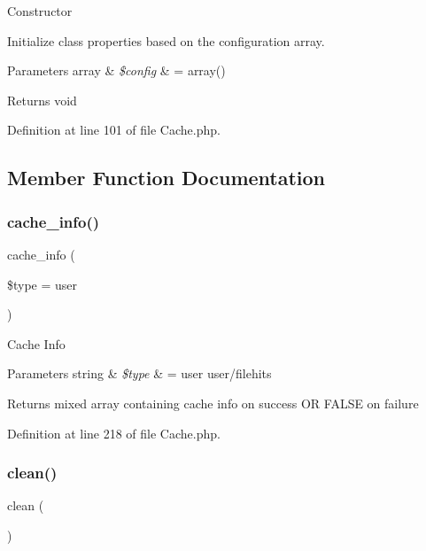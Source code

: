 Constructor

Initialize class properties based on the configuration array.


\begin{DoxyParams}[1]{Parameters}
array & {\em \$config} & = array() \\
\hline
\end{DoxyParams}
\begin{DoxyReturn}{Returns}
void 
\end{DoxyReturn}


Definition at line 101 of file Cache.\+php.



\subsection{Member Function Documentation}
\mbox{\label{class_c_i___cache_a26b8f7eef651dc3c0b5b9e1d8661a9ae}} 
\subsubsection{\texorpdfstring{cache\_info()}{cache\_info()}}
{\footnotesize\ttfamily cache\+\_\+info (\begin{DoxyParamCaption}\item[{}]{\$type = {\ttfamily \textquotesingle{}user\textquotesingle{}} }\end{DoxyParamCaption})}

Cache Info


\begin{DoxyParams}[1]{Parameters}
string & {\em \$type} & = \textquotesingle{}user\textquotesingle{} user/filehits \\
\hline
\end{DoxyParams}
\begin{DoxyReturn}{Returns}
mixed array containing cache info on success OR F\+A\+L\+SE on failure 
\end{DoxyReturn}


Definition at line 218 of file Cache.\+php.

\mbox{\label{class_c_i___cache_adb40b812890a8bc058bf6b7a0e1a54d9}} 
\subsubsection{\texorpdfstring{clean()}{clean()}}
{\footnotesize\ttfamily clean (\begin{DoxyParamCaption}{ }\end{DoxyParamCaption})}

